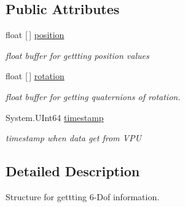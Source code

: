 \subsection*{Public Attributes}
\begin{DoxyCompactItemize}
\item 
\mbox{\label{struct_ximmerse_1_1_input_system_1_1_x_device_plugin_1_1_act_param__6_dof_info_a4f859b8682dd685b8ea2f8a06e1baa5d}} 
float \mbox{[}$\,$\mbox{]} \mbox{\hyperlink{struct_ximmerse_1_1_input_system_1_1_x_device_plugin_1_1_act_param__6_dof_info_a4f859b8682dd685b8ea2f8a06e1baa5d}{position}}
\begin{DoxyCompactList}\small\item\em float buffer for gettting position values \end{DoxyCompactList}\item 
\mbox{\label{struct_ximmerse_1_1_input_system_1_1_x_device_plugin_1_1_act_param__6_dof_info_ae96f8f61cebcb0d03da65e6edd983d49}} 
float \mbox{[}$\,$\mbox{]} \mbox{\hyperlink{struct_ximmerse_1_1_input_system_1_1_x_device_plugin_1_1_act_param__6_dof_info_ae96f8f61cebcb0d03da65e6edd983d49}{rotation}}
\begin{DoxyCompactList}\small\item\em float buffer for getting quaternions of rotation. \end{DoxyCompactList}\item 
\mbox{\label{struct_ximmerse_1_1_input_system_1_1_x_device_plugin_1_1_act_param__6_dof_info_a93bc65f9deb83d384e873149701c4971}} 
System.\+U\+Int64 \mbox{\hyperlink{struct_ximmerse_1_1_input_system_1_1_x_device_plugin_1_1_act_param__6_dof_info_a93bc65f9deb83d384e873149701c4971}{timestamp}}
\begin{DoxyCompactList}\small\item\em timestamp when data get from V\+PU \end{DoxyCompactList}\end{DoxyCompactItemize}


\subsection{Detailed Description}
Structure for gettting 6-\/\+Dof information. 

